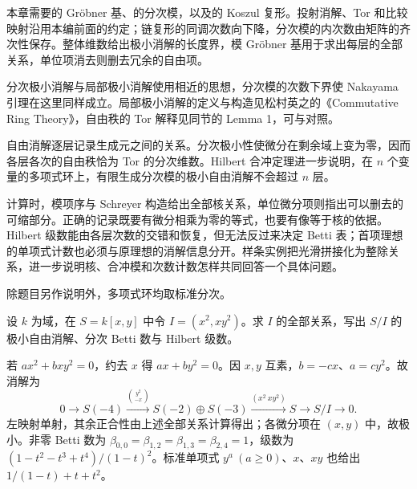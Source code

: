 \ProseParagraphBreak

本章需要的 Gröbner 基、的分次模，以及的 Koszul 复形。投射消解、Tor 和比较映射沿用本编前面的约定；链复形的同调次数向下降，分次模的内次数由矩阵的齐次性保存。整体维数给出极小消解的长度界，模 Gröbner 基用于求出每层的全部关系，单位项消去则删去冗余的自由项。

\ProseParagraphBreak
分次极小消解与局部极小消解使用相近的思想，分次模的次数下界使 Nakayama 引理在这里同样成立。局部极小消解的定义与构造见松村英之的《Commutative Ring Theory》\cite[\S 19, pp. 153--154]{Matsumura1989CommutativeRingTheory}，自由秩的 Tor 解释见同节的 Lemma 1\cite[\S 19, Lemma 1, p. 154]{Matsumura1989CommutativeRingTheory}，可与对照。








\begin{chaptersummary}
	自由消解逐层记录生成元之间的关系。分次极小性使微分在剩余域上变为零，因而各层各次的自由秩恰为 Tor 的分次维数。Hilbert 合冲定理进一步说明，在 \(n\) 个变量的多项式环上，有限生成分次模的极小自由消解不会超过 \(n\) 层。

	\ProseParagraphBreak
	计算时，模项序与 Schreyer 构造给出全部核关系，单位微分项则指出可以删去的可缩部分。正确的记录既要有微分相乘为零的等式，也要有像等于核的依据。Hilbert 级数能由各层次数的交错和恢复，但无法反过来决定 Betti 表；首项理想的单项式计数也必须与原理想的消解信息分开。样条实例把光滑拼接化为整除关系，进一步说明核、合冲模和次数计数怎样共同回答一个具体问题。
\end{chaptersummary}

\BookExercises
除题目另作说明外，多项式环均取标准分次。

\begin{exercise}\label{b3:ex:21-common-factor}
	设 \(k\) 为域，在 \(S=k[x,y]\) 中令 \(I=(x^2,xy^2)\)。求 \(I\) 的全部关系，写出 \(S/I\) 的极小自由消解、分次 Betti 数与 Hilbert 级数。
\end{exercise}
\begin{solution}
	若 \(ax^2+bxy^2=0\)，约去 \(x\) 得 \(ax+by^2=0\)。因 \(x,y\) 互素，\(b=-cx\)、\(a=cy^2\)。故消解为
	\[
		0\rightarrow S(-4)\xrightarrow{\binom{y^2}{-x}}S(-2)\oplus S(-3) \xrightarrow{(x^2\ xy^2)}S\rightarrow S/I\rightarrow0.
	\]
	左映射单射，其余正合性由上述全部关系计算得出；各微分项在 \((x,y)\) 中，故极小。非零 Betti 数为 \(\beta_{0,0}=\beta_{1,2}=\beta_{1,3}=\beta_{2,4}=1\)，级数为 \((1-t^2-t^3+t^4)/(1-t)^2\)。标准单项式 \(y^a\ (a\ge0)\)、\(x\)、\(xy\) 也给出 \(1/(1-t)+t+t^2\)。
\end{solution}

